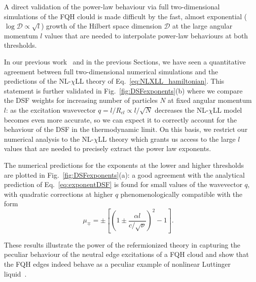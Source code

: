 \documentclass[twocolumn,pra,superscriptaddress,noshowpacs]{revtex4}
\newcommand{\nlchill}{NL-$\chi$LL }
\begin{document}

A direct validation of the power-law behaviour via full two-dimensional simulations of the FQH clould is made difficult by the fast, almost exponential ($\log\mathcal{D}\propto \sqrt{l}$) growth of the Hilbert space dimension $\mathcal{D}$ at the large angular momentum $l$ values that are needed to interpolate power-law behaviours at both thresholds.

In our previous work~\cite{Nardin_PRA_2023} and in the previous Sections, we have seen a quantitative agreement between full two-dimensional numerical simulations and the predictions of the \nlchill theory of Eq.~\eqref{eq:NLXLL_hamiltonian}. This statement is further validated in Fig.~\ref{fig:DSFexponents}(b) where we compare the DSF weights for increasing number of particles $N$ at fixed angular momentum $l$: as the excitation wavevector $q=l/R_{cl}\propto l/\sqrt{N}$ decreases the \nlchill model becomes even more accurate, so we can expect it to correctly account for the behaviour of the DSF in the thermodynamic limit. On this basis, we restrict our numerical analysis to the \nlchill theory which grants us access to the large $l$ values that are needed to precisely extract the power law exponents.

The numerical predictions for the exponents at the lower and higher thresholds are plotted in Fig.~\ref{fig:DSFexponents}(a): a good agreement with the analytical prediction of Eq.~\eqref{eq:exponentDSF} is found for small values of the wavevector $q$, with quadratic corrections at higher $q$ phenomenologically compatible with the form 
\begin{equation}
    \label{eq:ExponentDeviation}
    \mu_\mp=\pm\left[\left(1\pm \frac{\alpha l}{c/\sqrt{\nu}} \right)^2-1\right].
\end{equation}

These results illustrate the power of the refermionized theory in capturing the peculiar behaviour of the neutral edge excitations of a FQH cloud 
and show that the FQH edges indeed behave as a peculiar example of nonlinear Luttinger liquid~\cite{ImambekovGlazman_RMP_2012}.
\end{document}
